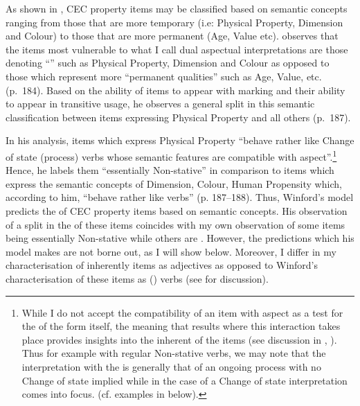 As shown in , CEC property items may be classified
based on semantic concepts ranging from those that are more temporary
(i.e: Physical Property, Dimension and Colour) to those that are more
permanent (Age, Value etc).  \citet{Winford1993} observes that the
items most vulnerable to what I call dual aspectual interpretations
are those denoting ``'' such as Physical Property,
Dimension and Colour as opposed to those which represent more
``permanent qualities'' such as Age, Value, etc. (p.~184).  Based on the
ability of items to appear with   marking and their
ability to appear in transitive usage, he observes a general split in
this semantic classification between items expressing Physical
Property and all others (p.~187).\largerpage[-2]

In his analysis, items which express Physical Property ``behave rather
like Change of state (process) verbs whose semantic features are
compatible with  aspect”.\footnote{While I do not accept the
  compatibility of an item with  aspect as a test for the
   of the form itself, the meaning that results where this
  interaction takes place provides insights into the inherent
   of the items (see discussion in ,
  ). Thus for example with regular Non-stative verbs,
  we may note that the interpretation with the  is
  generally that of an ongoing process with no Change of state implied
  while in the case of  a Change of state
  interpretation comes into focus. (cf. examples in 
  below).} Hence, he labels them ``essentially Non-stative” in
comparison to items which express the semantic concepts of Dimension,
Colour, Human Propensity which, according to him, ``behave rather like
 verbs” (p. 187--188).  Thus, Winford’s model predicts the
 of CEC property items based on semantic concepts.
His observation of a split in the  of these items coincides
with my own observation of some items being essentially Non-stative
while others are .  However, the predictions which his model
makes are not borne out, as I will show below.  Moreover, I differ in
my characterisation of inherently  items as adjectives as
opposed to Winford’s characterisation of these items as ()
verbs (see  for discussion).

